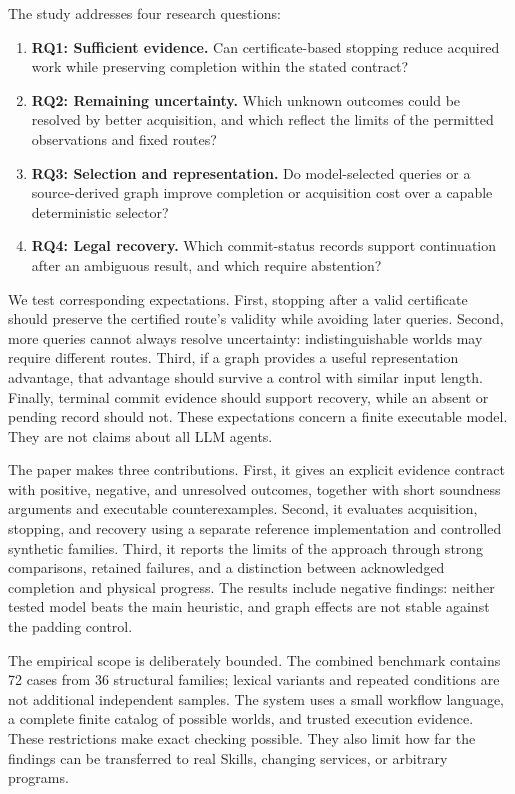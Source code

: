 \documentclass[conference]{IEEEtran}
\begin{document}
The study addresses four research questions:
\begin{enumerate}
\item \textbf{RQ1: Sufficient evidence.} Can certificate-based stopping reduce acquired work while preserving completion within the stated contract?
\item \textbf{RQ2: Remaining uncertainty.} Which unknown outcomes could be resolved by better acquisition, and which reflect the limits of the permitted observations and fixed routes?
\item \textbf{RQ3: Selection and representation.} Do model-selected queries or a source-derived graph improve completion or acquisition cost over a capable deterministic selector?
\item \textbf{RQ4: Legal recovery.} Which commit-status records support continuation after an ambiguous result, and which require abstention?
\end{enumerate}

We test corresponding expectations. First, stopping after a valid certificate should preserve the certified route's validity while avoiding later queries. Second, more queries cannot always resolve uncertainty: indistinguishable worlds may require different routes. Third, if a graph provides a useful representation advantage, that advantage should survive a control with similar input length. Finally, terminal commit evidence should support recovery, while an absent or pending record should not. These expectations concern a finite executable model. They are not claims about all LLM agents.

The paper makes three contributions. First, it gives an explicit evidence contract with positive, negative, and unresolved outcomes, together with short soundness arguments and executable counterexamples. Second, it evaluates acquisition, stopping, and recovery using a separate reference implementation and controlled synthetic families. Third, it reports the limits of the approach through strong comparisons, retained failures, and a distinction between acknowledged completion and physical progress. The results include negative findings: neither tested model beats the main heuristic, and graph effects are not stable against the padding control.

The empirical scope is deliberately bounded. The combined benchmark contains 72 cases from 36 structural families; lexical variants and repeated conditions are not additional independent samples. The system uses a small workflow language, a complete finite catalog of possible worlds, and trusted execution evidence. These restrictions make exact checking possible. They also limit how far the findings can be transferred to real Skills, changing services, or arbitrary programs.
\end{document}
